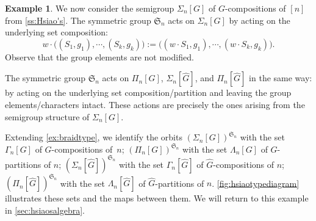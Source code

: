 \documentclass[11pt, oneside, reqno]{amsart}
\theoremstyle{definition}
\newtheorem{example}[theorem]{Example}
\numberwithin{equation}{section}
\def \sym{\mathfrak{S}}
\def \wh{\widehat}
\def \gsetcomposition{{\Sigma_n[G]}}
\def \gsetpartition{{\Pi_n[G]}}
\def \gcomposition{{\Gamma_n[G]}}
\def \gpartition{{\Lambda_n[G]}}
\def \hsiao {{\gsetcomposition}}
\begin{document}
\begin{example} \label{ex:invariantshsiao}
    We now consider the semigroup $\hsiao$ of $G$-compositions of $[n]$ from \cref{ss:Hsiao's}.
    The symmetric group $\sym_n$ acts on $\hsiao$ by acting on the underlying set composition:
    \[
        w \cdot \big( (S_1,g_1), \cdots, (S_k, g_k) \big) := \big( (w \cdot S_1,g_1), \cdots, (w \cdot S_k, g_k) \big).
    \]
    Observe that the group elements are not modified.
    
    The symmetric group $\sym_n$ acts on $\gsetpartition$, $\Sigma_n[\wh{G}]$, and $\Pi_n[\wh{G}]$ in the same way:
    by acting on the underlying set composition/partition and leaving the group elements/characters intact.
    These actions are precisely the ones arising from the semigroup structure of $\hsiao$.
    
    Extending \cref{ex:braidtype}, we identify the orbits
    $(\hsiao)^{\sym_n}$ with the set $\gcomposition$ of $G$-compositions of~$n$;
    $(\gsetpartition)^{\sym_n}$ with the set $\gpartition$ of $G$-partitions of $n$;
    $(\Sigma_n[\wh{G}])^{\sym_n}$ with the set $\Gamma_n[\wh{G}]$ of $\wh{G}$-compositions of $n$;
    $(\Pi_n[\wh{G}])^{\sym_n}$ with the set $\Lambda_n[\wh{G}]$ of $\wh{G}$-partitions of $n$.
    \cref{fig:hsiaotypediagram} illustrates these sets and the maps between them.
    We will return to this example in \cref{sec:hsiaosalgebra}.


\end{example}
\end{document}
